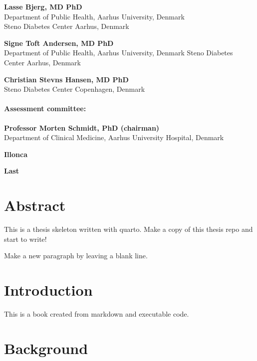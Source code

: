 \documentclass[
  a4paper,
  headsepline=true,
  open=any]{scrbook}
\begin{document}
\textbf{Lasse Bjerg, MD PhD}\\
Department of Public Health, Aarhus University, Denmark\\
Steno Diabetes Center Aarhus, Denmark

\textbf{Signe Toft Andersen, MD PhD}\\
Department of Public Health, Aarhus University, Denmark Steno Diabetes
Center Aarhus, Denmark

\textbf{Christian Stevns Hansen, MD PhD}\\
Steno Diabetes Center Copenhagen, Denmark

\hypertarget{assessment-committee}{%
\subsubsection*{Assessment committee:}\label{assessment-committee}}

\textbf{Professor Morten Schmidt, PhD (chairman)}\\
Department of Clinical Medicine, Aarhus University Hospital, Denmark

\textbf{Illonca}

\textbf{Last}


\hypertarget{abstract}{%
\chapter*{Abstract}\label{abstract}}


This is a thesis skeleton written with quarto. Make a copy of this
thesis repo and start to write!

Make a new paragraph by leaving a blank line.

\newpage
\tableofcontents


\hypertarget{introduction}{%
\chapter{Introduction}\label{introduction}}

This is a book created from markdown and executable code.


\hypertarget{background}{%
\chapter{Background}\label{background}}
\end{document}
